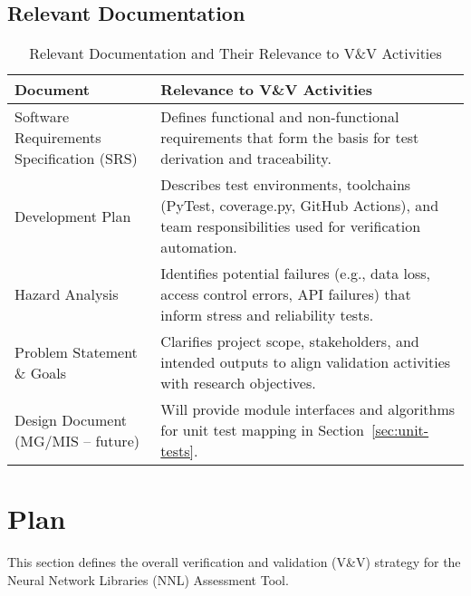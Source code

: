 \documentclass[12pt, titlepage]{article}
\renewcommand{\arraystretch}{1.15}
\begin{document}
\subsection{Relevant Documentation}
\label{subsec:relevant-docs}


\begin{table}[H]
\centering
\caption{Relevant Documentation and Their Relevance to V\&V Activities}
\setlength{\tabcolsep}{5pt}
\renewcommand{\arraystretch}{1.2}
\footnotesize

\begin{tabularx}{\textwidth}{l X}
\toprule
\textbf{Document} & \textbf{Relevance to V\&V Activities} \\
\midrule
\arrayrulecolor[gray]{0.8}
Software Requirements Specification (SRS) &
Defines functional and non-functional requirements that form the basis for
test derivation and traceability. \\
\hline
Development Plan &
Describes test environments, toolchains (PyTest, coverage.py, GitHub Actions),
and team responsibilities used for verification automation. \\
\hline
Hazard Analysis &
Identifies potential failures (e.g., data loss, access control errors, API
failures) that inform stress and reliability tests. \\
\hline
Problem Statement \& Goals &
Clarifies project scope, stakeholders, and intended outputs to align validation
activities with research objectives. \\
\hline
Design Document (MG/MIS – future) &
Will provide module interfaces and algorithms for unit test mapping in
Section~\ref{sec:unit-tests}. \\
\bottomrule
\end{tabularx}
\end{table}

\section{Plan}
\label{sec:plan}
This section defines the overall verification and validation (V\&V) strategy for
the Neural Network Libraries (NNL) Assessment Tool.
\end{document}
